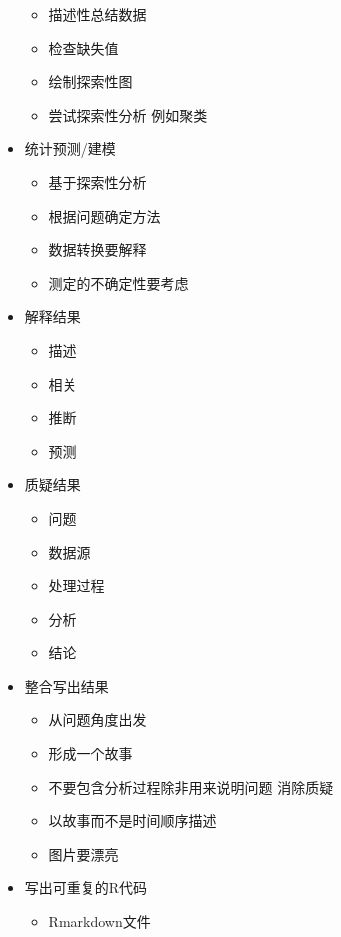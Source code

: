 \documentclass[
]{book}
\providecommand{\tightlist}{%
  \setlength{\itemsep}{0pt}\setlength{\parskip}{0pt}}
\begin{document}
\begin{itemize}
  \begin{itemize}
  \tightlist
  \item
    描述性总结数据
  \item
    检查缺失值
  \item
    绘制探索性图
  \item
    尝试探索性分析 例如聚类
  \end{itemize}
\item
  统计预测/建模

  \begin{itemize}
  \tightlist
  \item
    基于探索性分析
  \item
    根据问题确定方法
  \item
    数据转换要解释
  \item
    测定的不确定性要考虑
  \end{itemize}
\item
  解释结果

  \begin{itemize}
  \tightlist
  \item
    描述
  \item
    相关
  \item
    推断
  \item
    预测
  \end{itemize}
\item
  质疑结果

  \begin{itemize}
  \tightlist
  \item
    问题
  \item
    数据源
  \item
    处理过程
  \item
    分析
  \item
    结论
  \end{itemize}
\item
  整合写出结果

  \begin{itemize}
  \tightlist
  \item
    从问题角度出发
  \item
    形成一个故事
  \item
    不要包含分析过程除非用来说明问题 消除质疑
  \item
    以故事而不是时间顺序描述
  \item
    图片要漂亮
  \end{itemize}
\item
  写出可重复的R代码

  \begin{itemize}
  \tightlist
  \item
    Rmarkdown文件
  \end{itemize}
\end{itemize}
\end{document}
